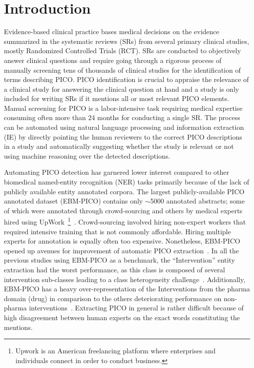 \documentclass[letterpaper]{article} %
\begin{document}
\section{Introduction}
\label{sec:intro}
%
Evidence-based clinical practice bases medical decisions on the evidence summarized in the systematic reviews (SRs) from several primary clinical studies, mostly Randomized Controlled Trials (RCT).
SRs are conducted to objectively answer clinical questions and require going through a rigorous process of manually screening tens of thousands of clinical studies for the identification of terms describing PICO.
PICO identification is crucial to appraise the relevance of a clinical study for answering the clinical question at hand and a study is only included for writing SRs if it mentions all or most relevant PICO elements.
Manual screening for PICO is a labor-intensive task requiring medical expertise consuming often more than 24 months for conducting a single SR.
The process can be automated using natural language processing and information extraction (IE) by directly pointing the human reviewers to the correct PICO descriptions in a study and automatically suggesting whether the study is relevant or not using machine reasoning over the detected descriptions.

Automating PICO detection has garnered lower interest compared to other biomedical named-entity recognition (NER) tasks primarily because of the lack of publicly available entity annotated corpora.
The largest publicly-available PICO annotated dataset (EBM-PICO) contains only $\sim$5000 annotated abstracts; some of which were annotated through crowd-sourcing and others by medical experts hired using UpWork~\footnote{Upwork is an American freelancing platform where enterprises and individuals connect in order to conduct business.}~\cite{nye2018corpus}.
Crowd-sourcing involved hiring non-expert workers that required intensive training that is not commonly affordable.
Hiring multiple experts for annotation is equally often too expensive.
Nonetheless, EBM-PICO opened up avenues for improvement of automatic PICO extraction~\cite{gu2020domain}.
In all the previous studies using EBM-PICO as a benchmark, the ``Intervention'' entity extraction had the worst performance, as this class is composed of several intervention sub-classes leading to a class heterogeneity challenge~\cite{jaseena2014issues, cardellino2017low}.
Additionally, EBM-PICO has a heavy over-representation of the Interventions from the pharma domain (drug) in comparison to the others deteriorating performance on non-pharma interventions~\cite{dhrangadhariya2021multipico}.
Extracting PICO in general is rather difficult because of high disagreement between human experts on the exact words constituting the mentions.
\end{document}
